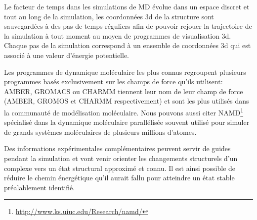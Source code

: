 
Le facteur de temps dans les simulations de MD évolue dans un espace discret et tout au long de la simulation, les coordonnées 3d de la structure sont sauvegardées à des pas de temps réguliers afin de pouvoir rejouer la trajectoire de la simulation à tout moment au moyen de programmes de visualisation 3d. Chaque pas de la simulation correspond à un ensemble de coordonnées 3d qui est associé à une valeur d'énergie potentielle.

Les programmes de dynamique moléculaire les plus connus regroupent plusieurs programmes basés exclusivement sur les champs de force qu'ils utilisent: AMBER, GROMACS ou CHARMM tiennent leur nom de leur champ de force (AMBER, GROMOS et CHARMM respectivement) et sont les plus utilisés dans la communauté de modélisation moléculaire. Nous pouvons aussi citer NAMD\footnote{\url{http://www.ks.uiuc.edu/Research/namd/}} \cite{phillips2005scalable} spécialisé dans la dynamique moléculaire parallélisée souvent utilisé pour simuler de grands systèmes moléculaires de plusieurs millions d'atomes.

Des informations expérimentales complémentaires peuvent servir de guides pendant la simulation et vont venir orienter les changements structurels d'un complexe vers un état structural approximé et connu. Il est ainsi possible de réduire le chemin énergétique qu'il aurait fallu pour atteindre un état stable préalablement identifié.

 \label{simu_interactive}

